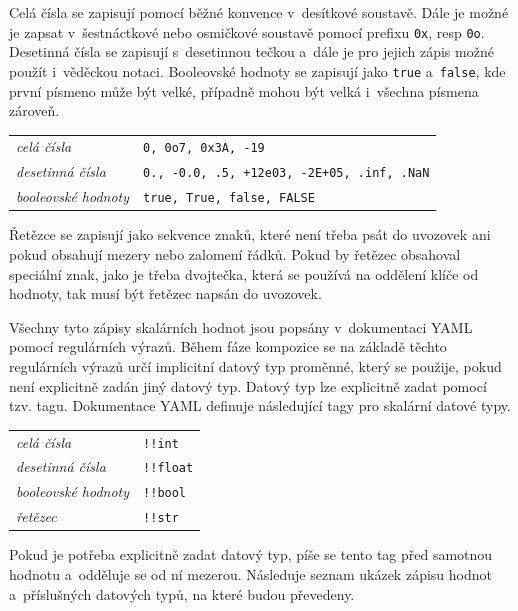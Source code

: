\documentclass[FM,bw,DP]{tulthesis}
\begin{document}
Celá čísla se zapisují pomocí běžné konvence v~desítkové soustavě. Dále je možné je zapsat v~šestnáctkové nebo osmičkové soustavě pomocí prefixu \texttt{0x}, resp \texttt{0o}. Desetinná čísla se zapisují s~desetinnou tečkou a~dále je pro jejich zápis možné použít i~věděckou notaci. Booleovské hodnoty se zapisují jako \texttt{true} a~\texttt{false}, kde první písmeno může být velké, případně mohou být velká i~všechna písmena zároveň.

\vspace{8pt}
\begin{tabular}{m{5cm}@{}l}
\textit{celá čísla}\dotfill & \texttt{0, 0o7, 0x3A, -19} \\
\textit{desetinná čísla}\dotfill & \texttt{0., -0.0, .5, +12e03, -2E+05, .inf, .NaN}  \\
\textit{booleovské hodnoty}\dotfill & \texttt{true, True, false, FALSE}\\
\end{tabular}
\vspace{8pt}

Řetězce se zapisují jako sekvence znaků, které není třeba psát do uvozovek ani pokud obsahují mezery nebo zalomení řádků. Pokud by řetězec obsahoval speciální znak, jako je třeba dvojtečka, která se používá na oddělení klíče od hodnoty, tak musí být řetězec napsán do uvozovek.

Všechny tyto zápisy skalárních hodnot jsou popsány v~dokumentaci YAML~\cite{bib:yaml} pomocí regulárních výrazů. Během fáze kompozice se na základě těchto regulárních výrazů určí implicitní datový typ proměnné, který se použije, pokud není explicitně zadán jiný datový typ. Datový typ lze explicitně zadat pomocí tzv. tagu. Dokumentace \gls{YAML} definuje následující tagy pro skalární datové typy.

\vspace{8pt}
\begin{tabular}{m{5cm}@{}l}
\textit{celá čísla}\dotfill & \texttt{!!int} \\
\textit{desetinná čísla}\dotfill & \texttt{!!float}  \\
\textit{booleovské hodnoty}\dotfill & \texttt{!!bool}\\
\textit{řetězec}\dotfill & \texttt{!!str} \\
\end{tabular}
\vspace{8pt}

Pokud je potřeba explicitně zadat datový typ, píše se tento tag před samotnou hodnotu a~odděluje se od ní mezerou. Následuje seznam ukázek zápisu hodnot a~příslušných datových typů, na které budou převedeny.
\end{document}
